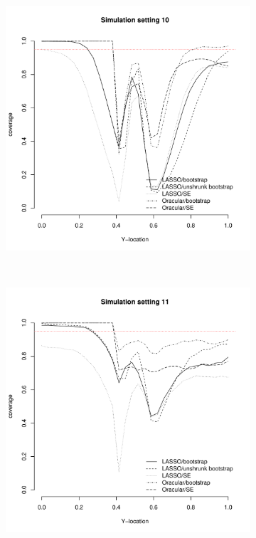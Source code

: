 \documentclass[authoryear, review, 11pt]{elsarticle}
\begin{document}
	\begin{figure}
		\centering
		\begin{subfigure}[b]{0.3\textwidth}
			\centering
			\includegraphics[width=\textwidth]{../../figures/simulation/28-10-profile-coverage.pdf}
			\label{fig:gull}
		\end{subfigure}%
        ~ %
		\begin{subfigure}[b]{0.3\textwidth}
			\centering
			\includegraphics[width=\textwidth]{../../figures/simulation/28-11-profile-coverage.pdf}

\end{subfigure}
\end{figure}
\end{document}
